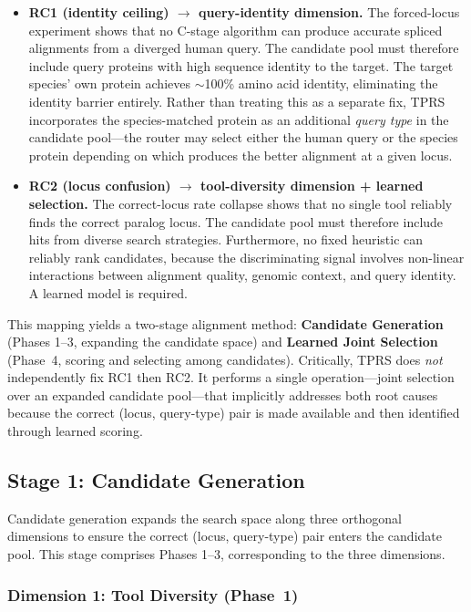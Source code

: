 \begin{itemize}
    \item \textbf{RC1 (identity ceiling) $\rightarrow$ query-identity dimension.} The forced-locus experiment shows that no C-stage algorithm can produce accurate spliced alignments from a diverged human query. The candidate pool must therefore include query proteins with high sequence identity to the target. The target species' own protein achieves $\sim$100\% amino acid identity, eliminating the identity barrier entirely. Rather than treating this as a separate fix, TPRS incorporates the species-matched protein as an additional \emph{query type} in the candidate pool---the router may select either the human query or the species protein depending on which produces the better alignment at a given locus.

    \item \textbf{RC2 (locus confusion) $\rightarrow$ tool-diversity dimension + learned selection.} The correct-locus rate collapse shows that no single tool reliably finds the correct paralog locus. The candidate pool must therefore include hits from diverse search strategies. Furthermore, no fixed heuristic can reliably rank candidates, because the discriminating signal involves non-linear interactions between alignment quality, genomic context, and query identity. A learned model is required.
\end{itemize}

This mapping yields a two-stage alignment method: \textbf{Candidate Generation} (Phases 1--3, expanding the candidate space) and \textbf{Learned Joint Selection} (Phase~4, scoring and selecting among candidates). Critically, TPRS does \emph{not} independently fix RC1 then RC2. It performs a single operation---joint selection over an expanded candidate pool---that implicitly addresses both root causes because the correct (locus, query-type) pair is made available and then identified through learned scoring.

\subsection{Stage 1: Candidate Generation}

Candidate generation expands the search space along three orthogonal dimensions to ensure the correct (locus, query-type) pair enters the candidate pool. This stage comprises Phases 1--3, corresponding to the three dimensions.

\subsubsection{Dimension 1: Tool Diversity (Phase~1)}

